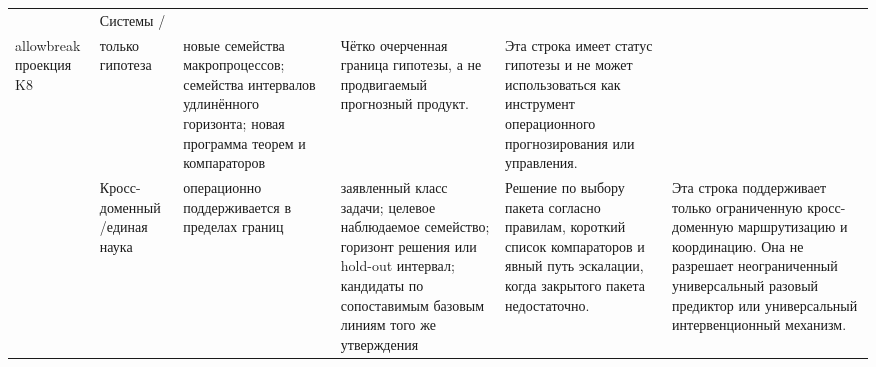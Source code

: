 \begin{longtable}{@{}L{0.13\textwidth}L{0.14\textwidth}L{0.12\textwidth}L{0.18\textwidth}L{0.17\textwidth}L{0.20\textwidth}@{}}
 & Системы /\\allowbreak проекция K8 & только гипотеза & новые семейства макропроцессов; \allowbreak семейства интервалов удлинённого горизонта; \allowbreak новая программа теорем и компараторов & Чётко очерченная граница гипотезы, а не продвигаемый прогнозный продукт. & Эта строка имеет статус гипотезы и не может использоваться как инструмент операционного прогнозирования или управления. \\
 & Кросс-доменный /\allowbreak единая наука & операционно поддерживается в пределах границ & заявленный класс задачи; \allowbreak целевое наблюдаемое семейство; \allowbreak горизонт решения или hold-out интервал; \allowbreak кандидаты по сопоставимым базовым линиям того же утверждения & Решение по выбору пакета согласно правилам, короткий список компараторов и явный путь эскалации, когда закрытого пакета недостаточно. & Эта строка поддерживает только ограниченную кросс-доменную маршрутизацию и координацию. Она не разрешает неограниченный универсальный разовый предиктор или универсальный интервенционный механизм. \\
\bottomrule
\end{longtable}

